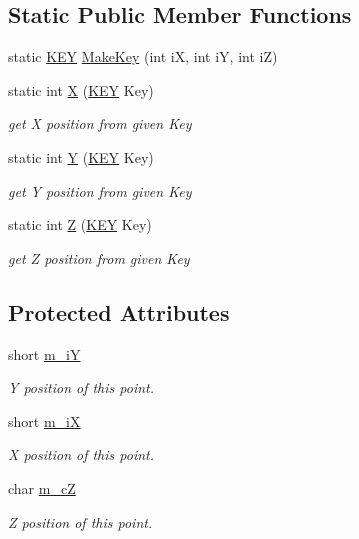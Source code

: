 \subsection*{Static Public Member Functions}
\begin{DoxyCompactItemize}
\item 
static \mbox{\hyperlink{res2dmp_8cpp_a8ae9d53f33f46cfcfcb9736e6351452a}{K\+EY}} \mbox{\hyperlink{classCPoint_aa93327a1be5e5d9df55f3eb9750af25d}{Make\+Key}} (int iX, int iY, int iZ)
\item 
static int \mbox{\hyperlink{classCPoint_aa748e36b6641c6259ca45e1cb7017f58}{X}} (\mbox{\hyperlink{res2dmp_8cpp_a8ae9d53f33f46cfcfcb9736e6351452a}{K\+EY}} Key)
\begin{DoxyCompactList}\small\item\em get X position from given Key \end{DoxyCompactList}\item 
static int \mbox{\hyperlink{classCPoint_a2760f11ef7f482c28c0385ef402faa9f}{Y}} (\mbox{\hyperlink{res2dmp_8cpp_a8ae9d53f33f46cfcfcb9736e6351452a}{K\+EY}} Key)
\begin{DoxyCompactList}\small\item\em get Y position from given Key \end{DoxyCompactList}\item 
static int \mbox{\hyperlink{classCPoint_a896823777dbcd50cceec722a9fee6ddb}{Z}} (\mbox{\hyperlink{res2dmp_8cpp_a8ae9d53f33f46cfcfcb9736e6351452a}{K\+EY}} Key)
\begin{DoxyCompactList}\small\item\em get Z position from given Key \end{DoxyCompactList}\end{DoxyCompactItemize}
\subsection*{Protected Attributes}
\begin{DoxyCompactItemize}
\item 
short \mbox{\hyperlink{classCPoint_a9b44115b3f3268f92c695e58bf8f910d}{m\+\_\+iY}}
\begin{DoxyCompactList}\small\item\em Y position of this point. \end{DoxyCompactList}\item 
short \mbox{\hyperlink{classCPoint_ac9057a0b88c5ef9904b6b1e0f8f6ef33}{m\+\_\+iX}}
\begin{DoxyCompactList}\small\item\em X position of this point. \end{DoxyCompactList}\item 
char \mbox{\hyperlink{classCPoint_af5bd6bd96c41a2f050fe2f5f2d6595de}{m\+\_\+cZ}}
\begin{DoxyCompactList}\small\item\em Z position of this point. \end{DoxyCompactList}\end{DoxyCompactItemize}
